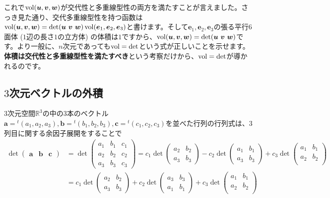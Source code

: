 これで$\operatorname{vol}(\boldsymbol{u}, \boldsymbol{v}, \boldsymbol{w})$が交代性と多重線型性の両方を満たすことが言えました。さっき見た通り、交代多重線型性を持つ函数は$\vol(\bm{u}, \bm{v}, \bm{w}) = \det(\bm{u}\ \bm{v}\ \bm{w}) \vol(\bm{e}_1, \bm{e}_2, \bm{e}_3)$と書けます。そして$\bm{e}_1, \bm{e}_2, \bm{e}_3$の張る平行$6$面体 ($1$辺の長さ$1$の立方体) の体積は$1$ですから、$\vol(\bm{u}, \bm{v}, \bm{w}) = \det(\bm{u}\ \bm{v}\ \bm{w})$です。より一般に、$n$次元であっても$\operatorname{vol} = \det$という式が正しいことを示せます。\textbf{体積は交代性と多重線型性を満たすべき}という考察だけから、$\operatorname{vol} = \det$が導かれるのです。

\subsection{$3$次元ベクトルの外積}

$3$次元空間$\mathbb{R}^3$の中の$3$本のベクトル$\bm{a} = {}^t(a_1, a_2, a_3), \bm{b} = {}^t(b_1, b_2, b_3), \bm{c} = {}^t(c_1, c_2, c_3)$を並べた行列の行列式は、$3$列目に関する余因子展開をすることで
\begin{align*}
\det
\begin{pmatrix}
\bm{a} & \bm{b} & \bm{c} 
\end{pmatrix}
&=
\det
\begin{pmatrix}
a_1 & b_1 & c_1 \\
a_2 & b_2 & c_2 \\
a_3 & b_3 & c_3
\end{pmatrix}
= 
c_1 \det
\begin{pmatrix}
a_2 & b_2 \\
a_3 & b_3
\end{pmatrix}
- c_2 \det
\begin{pmatrix}
a_1 & b_1 \\
a_3 & b_3
\end{pmatrix}
+ c_3 \det
\begin{pmatrix}
a_1 & b_1 \\
a_2 & b_2 \\
\end{pmatrix}
\\
&=
c_1 \det
\begin{pmatrix}
a_2 & b_2 \\
a_3 & b_3
\end{pmatrix}
+ c_2 \det
\begin{pmatrix}
a_3 & b_3 \\
a_1 & b_1
\end{pmatrix}
+ c_3 \det
\begin{pmatrix}
a_1 & b_1 \\
a_2 & b_2 \\
\end{pmatrix}
\end{align*}
